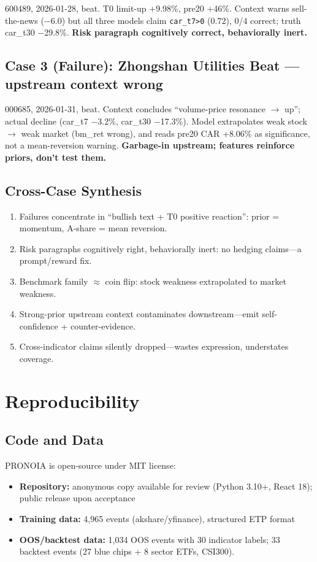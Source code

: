 \documentclass[sigconf, anonymous, review]{acmart}
\begin{document}
600489, 2026-01-28, beat. T0 limit-up +9.98\%, pre20 +46\%. Context warns sell-the-news ($-$6.0) but all three models claim \texttt{car\_t7>0} (0.72), 0/4 correct; truth car\_t30 $-$29.8\%. \textbf{Risk paragraph cognitively correct, behaviorally inert.}

\subsection*{Case 3 (Failure): Zhongshan Utilities Beat --- upstream context wrong}

000685, 2026-01-31, beat. Context concludes ``volume-price resonance $\to$ up''; actual decline (car\_t7 $-$3.2\%, car\_t30 $-$17.3\%). Model extrapolates weak stock $\to$ weak market (bm\_ret wrong), and reads pre20 CAR +8.06\% as significance, not a mean-reversion warning. \textbf{Garbage-in upstream; features reinforce priors, don't test them.}

\subsection*{Cross-Case Synthesis}

\begin{enumerate}
    \item Failures concentrate in ``bullish text + T0 positive reaction'': prior = momentum, A-share = mean reversion.
    \item Risk paragraphs cognitively right, behaviorally inert: no hedging claims---a prompt/reward fix.
    \item Benchmark family $\approx$ coin flip: stock weakness extrapolated to market weakness.
    \item Strong-prior upstream context contaminates downstream---emit self-confidence + counter-evidence.
    \item Cross-indicator claims silently dropped---wastes expression, understates coverage.
\end{enumerate}

\section{Reproducibility}

\subsection{Code and Data}

PRONOIA is open-source under MIT license:
\begin{itemize}
    \item \textbf{Repository:} anonymous copy available for review (Python 3.10+, React 18); public release upon acceptance
    \item \textbf{Training data:} 4,965 events (akshare/yfinance), structured ETP format
    \item \textbf{OOS/backtest data:} 1,034 OOS events with 30 indicator labels; 33 backtest events (27 blue chips + 8 sector ETFs, CSI300).
\end{itemize}
\end{document}
